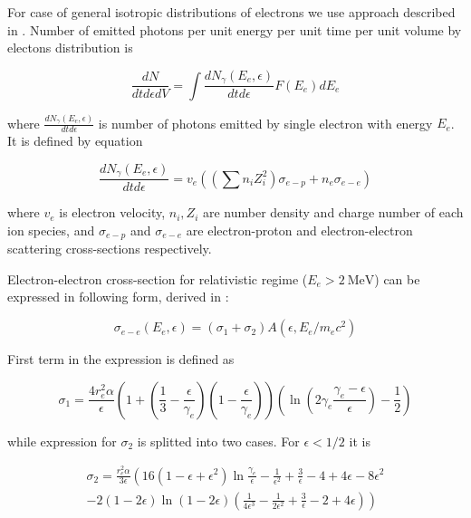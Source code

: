 For case of general isotropic distributions of electrons we use approach described in \cite{Baring1999}. Number of emitted photons per unit energy per unit time per unit volume by electons distribution is

\begin{equation}
	\frac{dN}{dt d\epsilon dV} = \int\frac{dN_{\gamma}\left(E_e, \epsilon\right)}{dt d\epsilon} F(E_e) dE_e
\end{equation}

where $\frac{dN_{\gamma}\left(E_e, \epsilon\right)}{dt d\epsilon}$ is number of photons emitted by single electron with energy $E_e$. It is defined by equation

\begin{equation}
	\frac{dN_{\gamma}\left(E_e, \epsilon\right)}{dt d\epsilon} = v_e \left(\left(\sum n_i Z_i^2\right)\sigma_{e-p} + n_e\sigma_{e-e}\right)
\end{equation}

where $v_e$ is electron velocity, $n_i, Z_i$ are number density and charge number of each ion species, and $\sigma_{e-p}$ and $\sigma_{e-e}$ are electron-proton and electron-electron scattering cross-sections respectively.

Electron-electron cross-section for relativistic regime ($E_e > 2~\text{MeV}$) can be expressed in following form, derived in \cite{BaierJETP1967} :

\begin{equation}
\sigma_{e-e}(E_e,\epsilon) = \left(\sigma_1 + \sigma_2\right)A\left(\epsilon, E_e/m_e c^2\right)
\end{equation}

First term in the expression is defined as

\begin{equation}\label{sigma1}
	\sigma_1 = \frac{4 r_e^2 \alpha}{\epsilon}\left(1+\left(\frac{1}{3}-\frac{\epsilon}{\gamma_e}\right)\left(1-\frac{\epsilon}{\gamma_e}\right)\right)\left(\ln\left(2\gamma_e\frac{\gamma_e - \epsilon}{\epsilon}\right)-\frac{1}{2}\right)
\end{equation}

while expression for $\sigma_2$ is splitted into two cases. For $\epsilon < 1/2$ it is

\begin{equation}
	\begin{split}
	\sigma_2 = \frac{r_e^2\alpha}{3\epsilon} \left( 16 \left( 1-\epsilon+\epsilon^2 \right) \ln\frac{\gamma_e}{\epsilon}-\frac{1}{\epsilon^2}+\frac{3}{\epsilon}-4+4\epsilon-8\epsilon^2 \right. \\ \left. - 2\left( 1-2\epsilon \right) \ln \left( 1-2\epsilon \right) \left( \frac{1}{4\epsilon^3}-\frac{1}{2\epsilon^2}+\frac{3}{\epsilon}-2+4\epsilon \right) \right)
	\end{split}
\end{equation}

